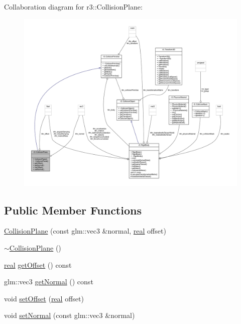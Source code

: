 Collaboration diagram for r3\+:\+:Collision\+Plane\+:\nopagebreak
\begin{figure}[H]
\begin{center}
\leavevmode
\includegraphics[width=350pt]{classr3_1_1_collision_plane__coll__graph}
\end{center}
\end{figure}
\subsection*{Public Member Functions}
\begin{DoxyCompactItemize}
\item 
\mbox{\hyperlink{classr3_1_1_collision_plane_add1bd6bbc252e0d021a6890205a05e56}{Collision\+Plane}} (const glm\+::vec3 \&normal, \mbox{\hyperlink{namespacer3_ab2016b3e3f743fb735afce242f0dc1eb}{real}} offset)
\item 
\mbox{\hyperlink{classr3_1_1_collision_plane_a4c83b51c544a5fda9d949baced5cea02}{$\sim$\+Collision\+Plane}} ()
\item 
\mbox{\hyperlink{namespacer3_ab2016b3e3f743fb735afce242f0dc1eb}{real}} \mbox{\hyperlink{classr3_1_1_collision_plane_a62e2b4bd6a811f8d2541329cd9a49bf8}{get\+Offset}} () const
\item 
glm\+::vec3 \mbox{\hyperlink{classr3_1_1_collision_plane_aa6605acf447da4e45084e6d25c1067ad}{get\+Normal}} () const
\item 
void \mbox{\hyperlink{classr3_1_1_collision_plane_ae37e09e6b807cdd800671daa5623b073}{set\+Offset}} (\mbox{\hyperlink{namespacer3_ab2016b3e3f743fb735afce242f0dc1eb}{real}} offset)
\item 
void \mbox{\hyperlink{classr3_1_1_collision_plane_a1fa140b6648f14bef9720ac0d4eefc99}{set\+Normal}} (const glm\+::vec3 \&normal)
\end{DoxyCompactItemize}
